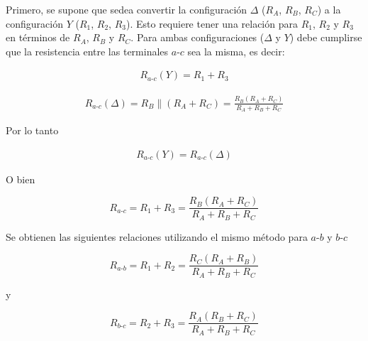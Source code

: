 \documentclass{article}
\begin{document}
Primero, se supone que sedea convertir la configuración $\Delta$ ($R_A$, $R_B$, $R_C$) a la configuración  $Y$ ($R_1$, $R_2$, $R_3$). Esto requiere tener una relación para $R_1$, $R_2$ y $R_3$ en términos de $R_A$, $R_B$ y $R_C$. Para ambas configuraciones ($\Delta$ y $Y$) debe cumplirse que la resistencia entre las terminales $a \text{-} c$ sea la misma, es decir:

\begin{align}
	R_{a \text{-} c}(Y) = R_1 + R_3
\end{align}

\begin{align}
	R_{a \text{-} c}(\Delta) = R_B \parallel (R_A + R_C) = \frac{R_B (R_A + R_C)}{R_A + R_B + R_C}
\end{align}

Por lo tanto

\begin{align}
		R_{a \text{-} c}(Y) = R_{a \text{-} c}(\Delta)
\end{align}

O bien

\begin{tcolorbox}[colback=red!5!white,colframe=red!75!black,arc=0mm,boxrule=0mm,width=(\linewidth+0.5cm)]
	\begin{equation}
		R_{a \text{-} c}= R_1 + R_3 = \frac{R_B (R_A + R_C)}{R_A + R_B + R_C}
	\end{equation}
\end{tcolorbox}

Se obtienen las siguientes relaciones utilizando el mismo método para $a \text{-} b$ y $b \text{-} c$ 

\begin{tcolorbox}[colback=red!5!white,colframe=red!75!black,arc=0mm,boxrule=0mm,width=(\linewidth+0.5cm)]
	\begin{equation}
		R_{a \text{-} b}= R_1 + R_2 = \frac{R_C (R_A + R_B)}{R_A + R_B + R_C}
	\end{equation}
\end{tcolorbox}

y

\begin{tcolorbox}[colback=red!5!white,colframe=red!75!black,arc=0mm,boxrule=0mm,width=(\linewidth+0.5cm)]
	\begin{equation}
		R_{b \text{-} c}= R_2 + R_3 = \frac{R_A (R_B + R_C)}{R_A + R_B + R_C}
	\end{equation}
\end{tcolorbox}
\end{document}
